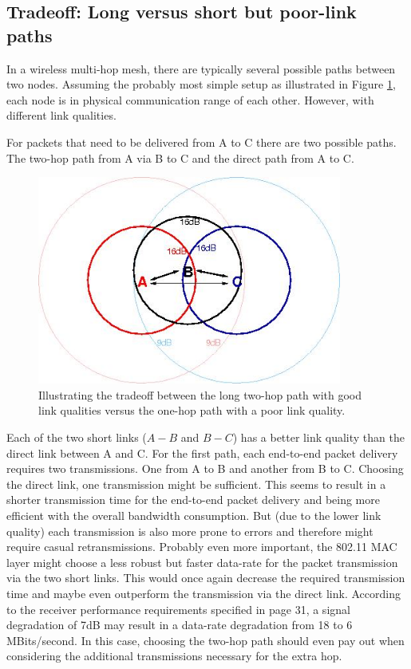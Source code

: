 \documentclass[11pt]{article}
\begin{document}
\subsection{Tradeoff: Long versus short but poor-link paths}

In a wireless multi-hop mesh, there are typically several possible paths between two nodes. 
Assuming the probably most simple setup as illustrated in Figure \ref{fig:longVsPoorHops}, 
each node is in physical communication range of each other. However, with different link qualities.

For packets that need to be delivered from A to C there are two possible paths. The two-hop path from A via B to C and the direct path from A to C.

\begin{figure}[htbp]
  \begin{center}
    \includegraphics[width=10cm]{longVsPoorHops-x01.jpg}
    \caption{Illustrating the tradeoff between the long two-hop path with good link qualities versus the one-hop path with a poor link quality.}
    \label{fig:longVsPoorHops}
  \end{center}
\end{figure}


Each of the two short links ($A-B$ and $B-C$) has a better link quality than the direct link between A and C. For the first path, each end-to-end packet delivery requires two transmissions. One from A to B and another from B to C.
%
Choosing the direct link, one transmission might be sufficient. This seems to result in a shorter transmission time for the end-to-end packet delivery and being more efficient with the overall bandwidth consumption. But (due to the lower link quality) each transmission is also more prone to errors and therefore might require casual retransmissions. 
%
Probably even more important, the 802.11 MAC layer might choose a less robust but faster data-rate for the packet transmission via the two short links. This would once again decrease the required transmission time and maybe even outperform the transmission via the direct link.
%
According to the receiver performance requirements specified in \cite{ieee80211a} page 31, a signal degradation of 7dB  may result in a data-rate degradation from 18 to 6 MBits/second. In this case, choosing the two-hop path should even pay out when considering the additional transmissions necessary for the extra hop.
\end{document}
